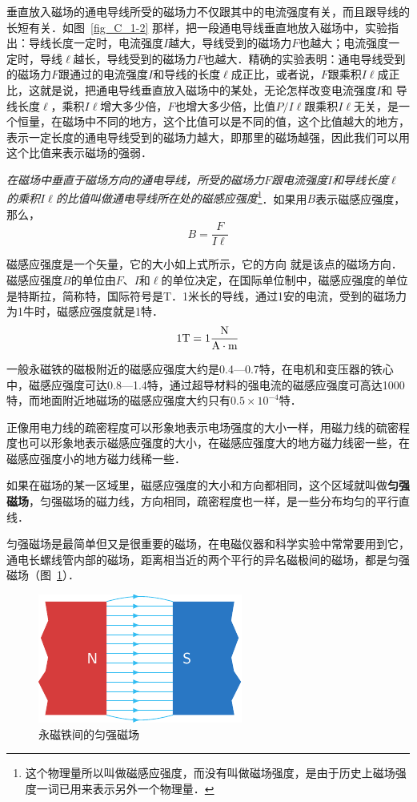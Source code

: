 垂直放入磁场的通电导线所受的磁场力不仅跟其中的电流强度有关，而且跟导线的长短有关．如图~\ref{fig_C_1-2} 那样，把一段通电导线垂直地放入磁场中，实验指出：导线长度一定时，电流强度$I$越大，导线受到的磁场力$F$也越大；电流强度一定时，导线$\ell$越长，导线受到的磁场力$F$也越大．精确的实验表明：通电导线受到的磁场力$F$跟通过的电流强度$I$和导线的长度$\ell$成正比，或者说，$F$跟乘积$I\ell$成正比，这就是说，把通电导线垂直放入磁场中的某处，无论怎样改变电流强度$I$和
导线长度$\ell$，乘积$I\ell$增大多少倍，$F$也增大多少倍，比值$P/I\ell$跟乘积$I\ell$无关，是一个恒量，在磁场中不同的地方，这个比值可以是不同的值，这个比值越大的地方，表示一定长度的通电导线受到的磁场力越大，即那里的磁场越强，因此我们可以用这个比值来表示磁场的强弱．

\textit{在磁场中垂直于磁场方向的通电导线，所受的磁场力$F$跟电流强度$I$和导线长度$\ell$的乘积$I\ell$的比值叫做通电导线所在处的磁感应强度}\footnote{这个物理量所以叫做磁感应强度，而没有叫做磁场强度，是由于历史上磁场强度一词已用来表示另外一个物理量．}．如果用$B$表示磁感应强度，那么，
\[B=\frac{F}{I\ell}\]

磁感应强度是一个矢量，它的大小如上式所示，它的方向
就是该点的磁场方向．磁感应强度$B$的单位由$F$、$I$和$\ell$的单位决定，在国际单位制中，磁感应强度的单位是特斯拉，简称特，国际符号是T．1米长的导线，通过1安的电流，受到的磁场力为1牛时，磁感应强度就是1特．
\[1{\rm T}=1\frac{\rm N}{\rm A\cdot m}\]

一般永磁铁的磁极附近的磁感应强度大约是0.4—0.7特，在电机和变压器的铁心中，磁感应强度可达0.8—1.4特，通过超导材料的强电流的磁感应强度可高达1000特，而地面附近地磁场的磁感应强度大约只有$0.5\times 10^{-4}$特．

正像用电力线的疏密程度可以形象地表示电场强度的大小一样，用磁力线的硫密程度也可以形象地表示磁感应强度的大小，在磁感应强度大的地方磁力线密一些，在磁感应强度小的地方磁力线稀一些．

如果在磁场的某一区域里，磁感应强度的大小和方向都相同，这个区域就叫做\textbf{匀强磁场}，匀强磁场的磁力线，方向相同，疏密程度也一样，是一些分布均匀的平行直线．

匀强磁场是最简单但又是很重要的磁场，在电磁仪器和科学实验中常常要用到它，通电长螺线管内部的磁场，距离相当近的两个平行的异名磁极间的磁场，都是匀强磁场（图~\ref{fig_C_1-16}）．

\begin{figure}[htbp]
    \centering
    \includegraphics{fig/C/1-16.pdf}
    \caption{永磁铁间的匀强磁场}\label{fig_C_1-16}
\end{figure}

